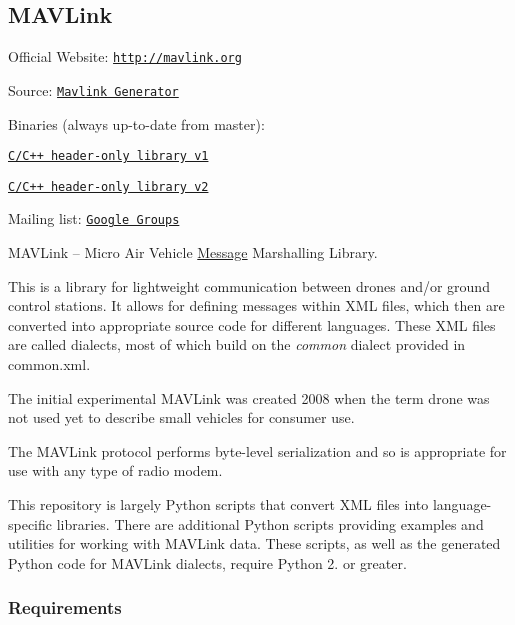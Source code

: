 \href{https://travis-ci.org/mavlink/mavlink}{\tt }

\subsection*{M\+A\+V\+Link}


\begin{DoxyItemize}
\item Official Website\+: \href{http://mavlink.org}{\tt http\+://mavlink.\+org}
\item Source\+: \href{https://github.com/mavlink/mavlink}{\tt Mavlink Generator}
\item Binaries (always up-\/to-\/date from master)\+:
\begin{DoxyItemize}
\item \href{https://github.com/mavlink/c_library_v1}{\tt C/\+C++ header-\/only library v1}
\item \href{https://github.com/mavlink/c_library_v2}{\tt C/\+C++ header-\/only library v2}
\end{DoxyItemize}
\item Mailing list\+: \href{http://groups.google.com/group/mavlink}{\tt Google Groups}
\end{DoxyItemize}

M\+A\+V\+Link -- Micro Air Vehicle \hyperlink{structMessage}{Message} Marshalling Library.

This is a library for lightweight communication between drones and/or ground control stations. It allows for defining messages within X\+ML files, which then are converted into appropriate source code for different languages. These X\+ML files are called dialects, most of which build on the {\itshape common} dialect provided in {\ttfamily common.\+xml}.

The initial experimental M\+A\+V\+Link was created 2008 when the term drone was not used yet to describe small vehicles for consumer use.

The M\+A\+V\+Link protocol performs byte-\/level serialization and so is appropriate for use with any type of radio modem.

This repository is largely Python scripts that convert X\+ML files into language-\/specific libraries. There are additional Python scripts providing examples and utilities for working with M\+A\+V\+Link data. These scripts, as well as the generated Python code for M\+A\+V\+Link dialects, require Python 2. or greater.

\subsubsection*{Requirements}


